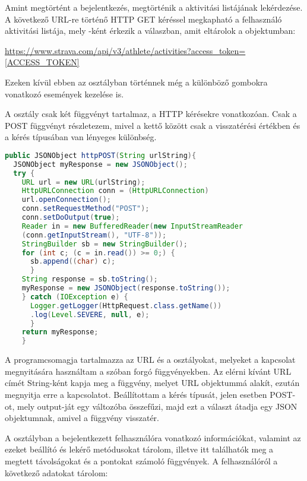 Amint megtörtént a bejelentkezés, megtörténik a  aktivitási listájának lekérdezése.
A következő URL-re történő HTTP GET kéréssel megkapható a felhasználó aktivitási listája, mely -ként érkezik a válaszban, amit eltárolok a  objektumban:

\url{
https://www.strava.com/api/v3/athlete/activities?access_token=[ACCESS_TOKEN] 
}

Ezeken kívül ebben az osztályban történnek még a különböző gombokra vonatkozó események kezelése is. 

A  osztály csak két függvényt tartalmaz, a HTTP kérésekre vonatkozóan.
Csak a POST függvényt részletezem, mivel a kettő között csak a visszatérési értékben és a kérés típusában van lényeges különbség.


\begin{lstlisting}[language=Java]
public JSONObject httpPOST(String urlString){
  JSONObject myResponse = new JSONObject();
  try {
    URL url = new URL(urlString);
    HttpURLConnection conn = (HttpURLConnection)
    url.openConnection();
    conn.setRequestMethod("POST");
    conn.setDoOutput(true);
    Reader in = new BufferedReader(new InputStreamReader
    (conn.getInputStream(), "UTF-8"));
    StringBuilder sb = new StringBuilder();
    for (int c; (c = in.read()) >= 0;) {
      sb.append((char) c);
      }
    String response = sb.toString();
    myResponse = new JSONObject(response.toString());   
    } catch (IOException e) {
      Logger.getLogger(HttpRequest.class.getName())
      .log(Level.SEVERE, null, e);
      }
    return myResponse;
    }
\end{lstlisting}


A  programcsomagja tartalmazza az URL és a  osztályokat, melyeket a kapcsolat megnyitására használtam a szóban forgó függvényekben.
Az elérni kívánt URL címét String-ként kapja meg a függvény, melyet URL objektummá alakít, ezután megnyitja erre a kapcsolatot.
Beállítottam a kérés típusát, jelen esetben POST-ot, mely output-ját egy  változóba összefűzi, majd ezt a választ átadja egy JSON objektumnak, amivel a függvény visszatér. 

A  osztályban a bejelentkezett felhasználóra vonatkozó információkat, valamint az ezeket beállító és lekérő metódusokat tárolom, illetve itt találhatók meg a megtett távolságokat és a pontokat számoló függvények.
A felhasználóról a következő adatokat tárolom: 

